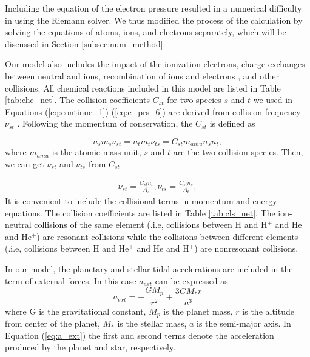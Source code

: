 \documentclass[journal, onecolumn]{aastex631}
\begin{document}
\begin{CJK*}{UTF8}{gbsn}
Including the equation of the electron pressure resulted in a numerical difficulty in using the Riemann solver. We thus modified the process of the calculation by solving the equations of atoms, ions, and electrons separately, which will be discussed in Section \ref{subsec:num_method}.

Our model also includes the impact of the ionization electrons, charge exchanges between neutral and ions, recombination of ions and electrons , and other collisions. All chemical reactions included in this model are listed in Table \ref{tab:che_net}. The collision coefficients $C_ {st}$ for two species $s$ and $t$ we used in Equations (\ref{eq:continue_1})-(\ref{eq:e_prs_6}) are derived from collision frequency $\nu_{st}$ \citep{Schunk1980}. Following the momentum of conservation, the $C_{st}$ is defined as

\begin{equation}\label{eq:cst_org}
n_ {s}m_ {s} \nu_ {st}=n_ {t}m_ {t} \nu_ {ts}=C_ {st}m_ {amu}n_ {s} n_{t},
\end{equation}
where $m_{amu}$ is the atomic mass unit, $s$ and $t$ are the two collision species. Then, we can get $\nu_ {st}$ and $\nu_{ts}$ from $C_ {st}$

\begin{equation}\label{eq:cst_nu}
\begin{aligned}
\nu_ {st} = \frac{C_ {st}n_ {t}}{A_ {s}},
\nu_ {ts} = \frac{C_ {st}n_ {s}}{A_ {t}},
\end{aligned}
\end{equation}
It is convenient to include the collisional terms in momentum and energy equations. The collision coefficients are listed in Table \ref{tab:cls_net}. The ion-neutral collisions of the same element (.i.e, collisions between H and H$^+$ and He and He$^+$) are resonant collisions while the collisions between different elements (.i.e, collisions between H and He$^+$ and He and H$^+$) are nonresonant collisions.

In our model, the planetary and stellar tidal accelerations are included in the term of external forces. In this case $a_{ext}$ can be expressed as
\begin{equation}\label{eq:a_ext}
a_{ext}=-\frac{GM_{p}}{r^2}+\frac{3GM_{*}r}{a^3}
\end{equation}
where G is the gravitational constant, $M_{p}$ is the planet mass, $r$ is the altitude from center of the planet, $M_{*}$ is the stellar mass, $a$ is the semi-major axis. In Equation (\ref{eq:a_ext}) the first and second terms denote the acceleration produced by the planet and star, respectively.


\end{CJK*}
\end{document}
